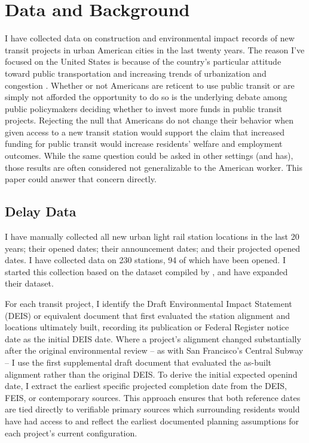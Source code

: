 \documentclass[12pt]{article}
\begin{document}
\section{Data and Background}\label{sec:data}
I have collected data on construction and environmental impact records of new transit projects in urban American cities in the last twenty years. The reason I've focused on the United States is because of the country's particular attitude toward public transportation and increasing trends of urbanization and congestion \parencite{roseTrafficCongestionHits2025, fhwa2026ucr}. Whether or not Americans are reticent to use public transit or are simply not afforded the opportunity to do so is the underlying debate among public policymakers deciding whether to invest more funds in public transit projects. Rejecting the null that Americans do not change their behavior when given access to a new transit station would support the claim that increased funding for public transit would increase residents' welfare and employment outcomes. While the same question could be asked in other settings (and has), those results are often considered not generalizable to the American worker. This paper could answer that concern directly. 

\subsection{Delay Data}
I have manually collected all new urban light rail station locations in the last 20 years; their opened dates; their announcement dates; and their projected opened dates. I have collected data on 230 stations, 94 of which have been opened. I started this collection based on the dataset compiled by \textcite{levy_2025_9wnjp-kez15}, and have expanded their dataset. 

For each transit project, I identify the Draft Environmental Impact Statement (DEIS) or equivalent document that first evaluated the station alignment and locations ultimately built, recording its publication or Federal Register notice date as the initial DEIS date. Where a project's alignment changed substantially after the original environmental review -- as with San Francisco's Central Subway -- I use the first supplemental draft document that evaluated the as-built alignment rather than the original DEIS. To derive the initial expected openind date, I extract the earliest specific projected completion date from the DEIS, FEIS, or contemporary sources. This approach ensures that both reference dates are tied directly to verifiable primary sources which surrounding residents would have had access to and reflect the earliest documented planning assumptions for each project's current configuration.
\end{document}
